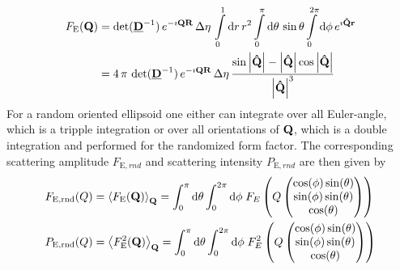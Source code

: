 \begin{align}
F_\mathrm{E}(\B{Q}) &=
\det(\M{D}^{-1})\, e^{-\imath\B{QR}}\, \Delta\eta\, \int\limits_0^1
\mathrm{d}r\, r^2 \int\limits_0^{\pi} \mathrm{d}\theta\, \sin \theta \int\limits_0^{2\pi}
\mathrm{d}\phi \, e^{\imath\B{\hat{Q}r}} \nonumber \\
&=
\displaystyle 4\, \pi\, \det(\M{D}^{-1})\, e^{-\imath\B{QR}}\,
\Delta\eta\, \frac{\sin \abs{\B{\hat{Q}}}-
\abs{\B{\hat{Q}}}\cos \abs{\B{\hat{Q}}}}{\abs{\B{\hat{Q}}}^3}
\label{eq:form:E}
\end{align}
For a random oriented ellipsoid one either can integrate over all Euler-angle, which is a tripple integration or over all orientations of $\B{Q}$, which is a double integration and performed for the randomized form factor. The corresponding scattering amplitude $F_{\mathrm{E},rnd}$ and scattering intensity $P_{\mathrm{E},rnd}$ are then given by
\begin{align}
F_{\mathrm{E,rnd}}(Q) &= \left\langle F_\mathrm{E}(\B{Q})\right\rangle_\B{Q} = \int_0^\pi\mathrm{d}\theta \int_0^{2\pi}\mathrm{d}\phi \; F_E\left(Q\begin{pmatrix}
                                       \cos(\phi)\sin(\theta) \\
                                       \sin(\phi)\sin(\theta) \\
                                       \cos(\theta)
                                     \end{pmatrix}\right) \\
P_{\mathrm{E,rnd}}(Q) &= \left\langle F_\mathrm{E}^2(\B{Q})\right\rangle_\B{Q} = \int_0^\pi\mathrm{d}\theta \int_0^{2\pi}\mathrm{d}\phi \; F_E^2\left(Q\begin{pmatrix}
                                       \cos(\phi)\sin(\theta) \\
                                       \sin(\phi)\sin(\theta) \\
                                       \cos(\theta)
                                     \end{pmatrix}\right)
\end{align}

